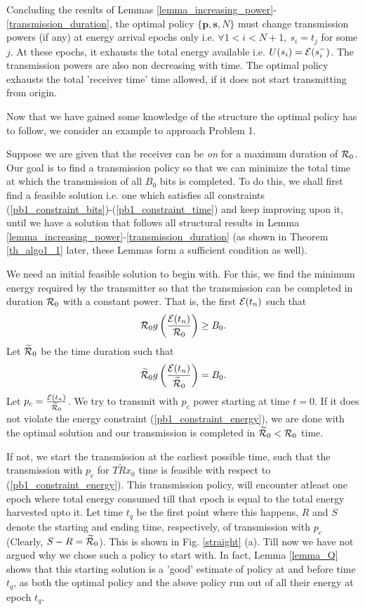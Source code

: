 
Concluding the results of Lemmas \ref{lemma_increasing_power}-\ref{transmission_duration}, the optimal policy $\{\textbf{p},\textbf{s},N\}$ must change transmission powers (if any) at energy arrival epochs only i.e. $\forall 1<i<N+1,\ s_i=t_j$ for some $j$. At these epochs, it exhausts the total energy available i.e. $U(s_i)=\mathcal{E}(s_i^-)$. The transmission powers are also non decreasing with time. The optimal policy exhausts the total 'receiver time' time allowed, if it does not start transmitting from origin.

Now that we have gained some knowledge of the structure the optimal policy has to follow, we consider an example to approach Problem 1. 

Suppose we are given that the receiver can be \textit{on} for a maximum duration of $\mathcal{R}_0$. Our goal is to find a transmission policy so that we can minimize the total time at which the transmission of all $B_0$ bits is completed. To do this, we shall first find a feasible solution i.e. one which satisfies all constraints (\ref{pb1_constraint_bits})-(\ref{pb1_constraint_time}) and keep improving upon it, until we have a solution that follows all structural results in Lemma \ref{lemma_increasing_power}-\ref{transmission_duration} (as shown in Theorem \ref{th_algo1_1} later,  these Lemmas form a sufficient condition as well).

We need an initial feasible solution to begin with. For this, we find the minimum energy required by the transmitter so that the transmission can be completed in duration $\mathcal{R}_0$ with a constant power. That is, the first $\mathcal{E}(t_n)$ such that
\begin{equation}
\mathcal{R}_0 g\left(\frac{\mathcal{E}(t_n)}{\mathcal{R}_0}\right)\geq B_0.
\end{equation}
Let $\widetilde{\mathcal{R}}_0$ be the time duration such that
\begin{equation}
\widetilde{\mathcal{R}}_0 g\left(\frac{\mathcal{E}(t_n)}{\widetilde{\mathcal{R}}_0}\right)=B_0.
\end{equation}
Let $p_c=\frac{\mathcal{E}(t_n)}{\widetilde{\mathcal{R}}_0}$. We try to transmit with $p_c$ power starting at time $t=0$. If it does not violate the energy constraint (\ref{pb1_constraint_energy}), we are done with the optimal solution and our transmission is completed in $\widetilde{\mathcal{R}}_0<\mathcal{R}_0$ time.

If not, we start the transmission at the earliest possible time, such that the transmission with $p_c$ for $\widetilde{TRx}_0$ time is feasible with respect to (\ref{pb1_constraint_energy}). This transmission policy, will encounter atleast one epoch where total energy consumed till that epoch is equal to the total energy harvested upto it. Let time $t_q$ be the first point where this happens, $R$ and $S$ denote the starting and ending time, respectively, of transmission with $p_c$ (Clearly, $S-R=\widetilde{\mathcal{R}}_0$). This is shown in Fig. \ref{straight} (a).  Till now we have not argued why we chose such a policy to start with. In fact, Lemma \ref{lemma_Q} shows that this starting solution is a 'good' estimate of policy at and before time $t_q$, as both the optimal policy and the above policy run out of all their energy at epoch $t_q$. 

